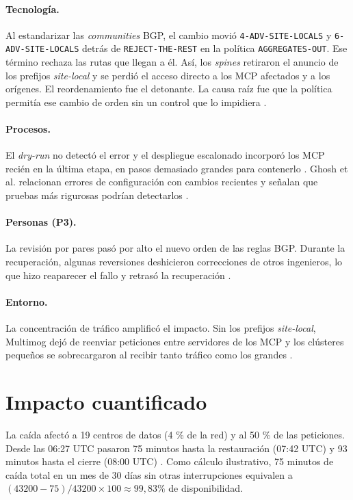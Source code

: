 \documentclass[10pt,a4paper]{article}
\begin{document}
\paragraph{Tecnología.}
Al estandarizar las \emph{communities} BGP, el cambio movió \texttt{4-ADV-SITE-LOCALS} y \texttt{6-ADV-SITE-LOCALS} detrás de \texttt{REJECT-THE-REST} en la política \texttt{AGGREGATES-OUT}. Ese término rechaza las rutas que llegan a él. Así, los \emph{spines} retiraron el anuncio de los prefijos \emph{site-local} y se perdió el acceso directo a los MCP afectados y a los orígenes. El reordenamiento fue el detonante. La causa raíz fue que la política permitía ese cambio de orden sin un control que lo impidiera \cite{cloudflare2022}.

\paragraph{Procesos.}
El \emph{dry-run} no detectó el error y el despliegue escalonado incorporó los MCP recién en la última etapa, en pasos demasiado grandes para contenerlo \cite{cloudflare2022}. Ghosh et al. relacionan errores de configuración con cambios recientes y señalan que pruebas más rigurosas podrían detectarlos \cite{ghosh2022}.

\paragraph{Personas (P3).}
La revisión por pares pasó por alto el nuevo orden de las reglas BGP. Durante la recuperación, algunas reversiones deshicieron correcciones de otros ingenieros, lo que hizo reaparecer el fallo y retrasó la recuperación \cite{cloudflare2022}.

\paragraph{Entorno.}
La concentración de tráfico amplificó el impacto. Sin los prefijos \emph{site-local}, Multimog dejó de reenviar peticiones entre servidores de los MCP y los clústeres pequeños se sobrecargaron al recibir tanto tráfico como los grandes \cite{cloudflare2022}.

\section{Impacto cuantificado}
La caída afectó a 19 centros de datos (4 \% de la red) y al 50 \% de las peticiones. Desde las 06:27 UTC pasaron 75 minutos hasta la restauración (07:42 UTC) y 93 minutos hasta el cierre (08:00 UTC) \cite{cloudflare2022}. Como cálculo ilustrativo, 75 minutos de caída total en un mes de 30 días sin otras interrupciones equivalen a $(43200-75)/43200 \times 100 \approx 99{,}83\%$ de disponibilidad.
\end{document}
